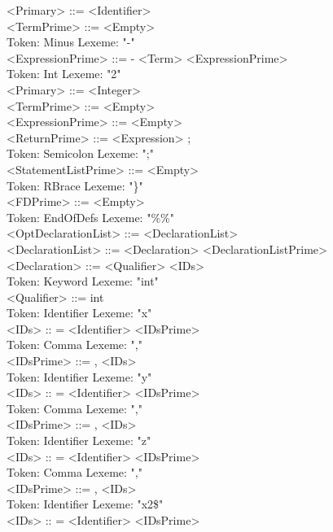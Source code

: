 \documentclass[11pt]{article}
\begin{document}
        <Primary> ::= <Identifier> \\
        <TermPrime> ::= <Empty> \\
Token: Minus     Lexeme: "-" \\
        <ExpressionPrime> ::= - <Term> <ExpressionPrime> \\
Token: Int       Lexeme: "2" \\
        <Primary> ::= <Integer> \\
        <TermPrime> ::= <Empty> \\
        <ExpressionPrime> ::= <Empty> \\
        <ReturnPrime> ::= <Expression> ; \\
Token: Semicolon         Lexeme: ";" \\
        <StatementListPrime> ::= <Empty> \\
Token: RBrace    Lexeme: "\}" \\
        <FDPrime> ::= <Empty> \\
Token: EndOfDefs         Lexeme: "\%\%" \\
        <OptDeclarationList> ::= <DeclarationList> \\
        <DeclarationList> ::= <Declaration> <DeclarationListPrime> \\
        <Declaration> ::= <Qualifier> <IDs> \\
Token: Keyword   Lexeme: "int" \\
        <Qualifier> ::= int \\
Token: Identifier        Lexeme: "x" \\
        <IDs> :: = <Identifier> <IDsPrime> \\
Token: Comma     Lexeme: "," \\
        <IDsPrime> ::= , <IDs> \\
Token: Identifier        Lexeme: "y" \\
        <IDs> :: = <Identifier> <IDsPrime> \\
Token: Comma     Lexeme: "," \\
        <IDsPrime> ::= , <IDs> \\
Token: Identifier        Lexeme: "z" \\
        <IDs> :: = <Identifier> <IDsPrime> \\
Token: Comma     Lexeme: "," \\
        <IDsPrime> ::= , <IDs> \\
Token: Identifier        Lexeme: "x2\$" \\
        <IDs> :: = <Identifier> <IDsPrime> \\
\end{document}
